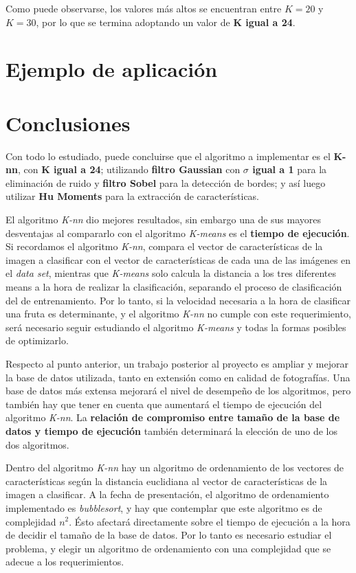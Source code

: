 \documentclass[10pt,a4paper]{article}
\begin{document}
Como puede observarse, los valores más altos se encuentran entre $K=20$ y $K=30$, por lo que se termina adoptando un valor de \textbf{K igual a 24}.

\section{Ejemplo de aplicación}


\section{Conclusiones}
Con todo lo estudiado, puede concluirse que el algoritmo a implementar es el \textbf{K-nn}, con \textbf{K igual a 24}; utilizando \textbf{filtro Gaussian} con \textbf{$\sigma$ igual a 1} para la eliminación de ruido y \textbf{filtro Sobel} para la detección de bordes; y así luego utilizar \textbf{Hu Moments} para la extracción de características.

El algoritmo \textit{K-nn} dio mejores resultados, sin embargo una de sus mayores desventajas al compararlo con el algoritmo \textit{K-means} es el \textbf{tiempo de ejecución}. Si recordamos el algoritmo \textit{K-nn}, compara el vector de características de la imagen a clasificar con el vector de características de cada una de las imágenes en el \textit{data set}, mientras que \textit{K-means} solo calcula la distancia a los tres diferentes means a la hora de realizar la clasificación, separando el proceso de clasificación del de entrenamiento. Por lo tanto, si la velocidad necesaria a la hora de clasificar una fruta es determinante, y el algoritmo \textit{K-nn} no cumple con este requerimiento, será necesario seguir estudiando el algoritmo \textit{K-means} y todas la formas posibles de optimizarlo.

Respecto al punto anterior, un trabajo posterior al proyecto es ampliar y mejorar la base de datos utilizada, tanto en extensión como en calidad de fotografías. Una base de datos más extensa mejorará el nivel de desempeño de los algoritmos, pero también hay que tener en cuenta que aumentará el tiempo de ejecución del algoritmo \textit{K-nn}. La \textbf{relación de compromiso entre tamaño de la base de datos y tiempo de ejecución} también determinará la elección de uno de los dos algoritmos.

Dentro del algoritmo \textit{K-nn} hay un algoritmo de ordenamiento de los vectores de características según la distancia euclidiana al vector de características de la imagen a clasificar. A la fecha de presentación, el algoritmo de ordenamiento implementado es \textit{bubblesort}, y hay que contemplar que este algoritmo es de complejidad $n^{2}$. Ésto afectará directamente sobre el tiempo de ejecución a la hora de decidir el tamaño de la base de datos. Por lo tanto es necesario estudiar el problema, y elegir un algoritmo de ordenamiento con una complejidad que se adecue a los requerimientos.
\end{document}

